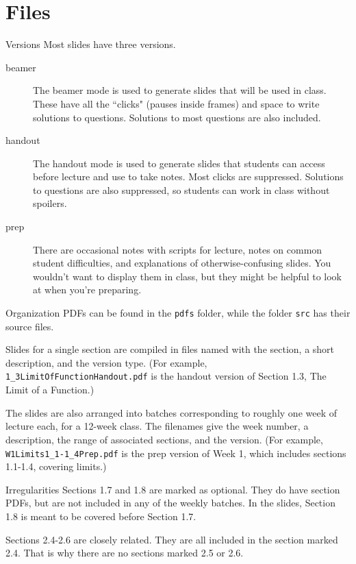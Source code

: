 \documentclass[10pt]{beamer}
\begin{document}
\section{Files}
\frame{\tableofcontents[currentsection]}
\begin{frame}{Versions}
Most slides have three versions.
\begin{description}
\item[beamer] The beamer mode is used to generate slides that will be used in class. These have all the ``clicks" (pauses inside frames) and space to write solutions to questions. Solutions to most questions are also included.
\item[handout] The handout mode is used to generate slides that students can access before lecture and use to take notes. Most clicks are suppressed. Solutions to questions are also suppressed, so students can work in class without spoilers.
\item[prep] There are occasional notes with scripts for lecture, notes on common student difficulties, and explanations of otherwise-confusing slides. You wouldn't want to display them in class, but they might be helpful to look at when you're preparing.
\end{description}
\end{frame}
\begin{frame}{Organization}
PDFs can be found in the \texttt{pdfs} folder, while the folder \texttt{src} has their source files.
\vfill

Slides for a single section are compiled in files named with the section, a short description, and the version type. (For example, \texttt{1\_3LimitOfFunctionHandout.pdf} is the handout version of Section 1.3, The Limit of a Function.) 

\vfill
The slides are also arranged into batches corresponding to roughly one week of lecture each, for a 12-week class. The filenames give the week number, a description, the range of associated sections, and the version.
(For example, \texttt{W1Limits1\_1-1\_4Prep.pdf} is the prep version of Week 1, which includes sections 1.1-1.4, covering limits.) 
\vfill
\end{frame}
\begin{frame}{Irregularities}
Sections 1.7 and 1.8 are marked as optional. They do have section PDFs, but are not included in any of the weekly batches. In the slides, Section 1.8 is meant to be covered before Section 1.7.\vfill

Sections 2.4-2.6 are closely related. They are all included in the section marked 2.4. That is why there are no sections marked 2.5 or 2.6.\vfill
\end{frame}
\end{document}
